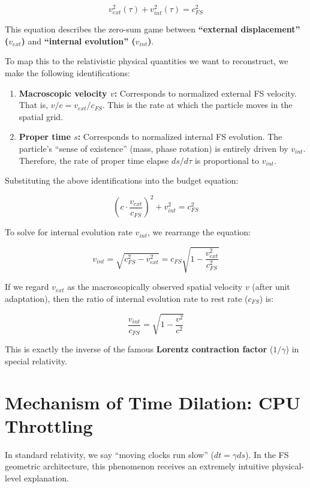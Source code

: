 $$v_{ext}^2(\tau) + v_{int}^2(\tau) = c_{FS}^2$$

This equation describes the zero-sum game between \textbf{``external displacement'' ($v_{ext}$)} and \textbf{``internal evolution'' ($v_{int}$)}.

To map this to the relativistic physical quantities we want to reconstruct, we make the following identifications:

\begin{enumerate}
\item \textbf{Macroscopic velocity $v$:} Corresponds to normalized external FS velocity. That is, \textbf{$v/c = v_{ext}/c_{FS}$}. This is the rate at which the particle moves in the spatial grid.

\item \textbf{Proper time $s$:} Corresponds to normalized internal FS evolution. The particle's ``sense of existence'' (mass, phase rotation) is entirely driven by \textbf{$v_{int}$}. Therefore, the rate of proper time elapse \textbf{$ds/d\tau$} is proportional to \textbf{$v_{int}$}.
\end{enumerate}

Substituting the above identifications into the budget equation:

$$(c \cdot \frac{v_{ext}}{c_{FS}})^2 + v_{int}^2 = c_{FS}^2$$

To solve for internal evolution rate \textbf{$v_{int}$}, we rearrange the equation:

$$v_{int} = \sqrt{c_{FS}^2 - v_{ext}^2} = c_{FS} \sqrt{1 - \frac{v_{ext}^2}{c_{FS}^2}}$$

If we regard \textbf{$v_{ext}$} as the macroscopically observed spatial velocity \textbf{$v$} (after unit adaptation), then the ratio of internal evolution rate to rest rate (\textbf{$c_{FS}$}) is:

$$\frac{v_{int}}{c_{FS}} = \sqrt{1 - \frac{v^2}{c^2}}$$

This is exactly the inverse of the famous \textbf{Lorentz contraction factor} (\textbf{$1/\gamma$}) in special relativity.

\section{Mechanism of Time Dilation: CPU Throttling}

In standard relativity, we say ``moving clocks run slow'' (\textbf{$dt = \gamma ds$}). In the FS geometric architecture, this phenomenon receives an extremely intuitive physical-level explanation.

